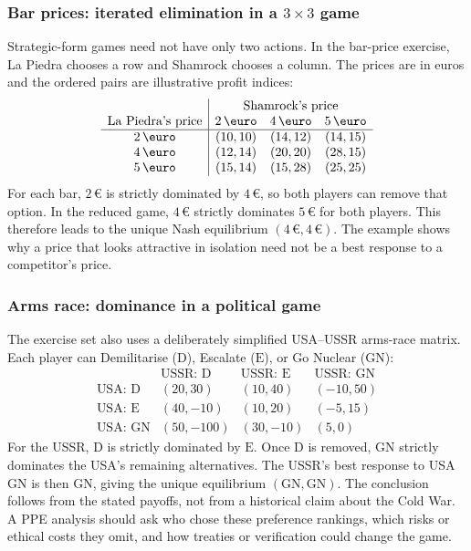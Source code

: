 \subsubsection{Bar prices: iterated elimination in a \(3\times3\) game}

Strategic-form games need not have only two actions. In the bar-price exercise,
La Piedra chooses a row and Shamrock chooses a column. The prices are in euros
and the ordered pairs are illustrative profit indices:
\[
\begin{array}{c|ccc}
 & \multicolumn{3}{c}{\text{Shamrock's price}}\\
\text{La Piedra's price} & 2\,\euro & 4\,\euro & 5\,\euro\\
\hline
2\,\euro & (10,10) & (14,12) & (14,15)\\
4\,\euro & (12,14) & (20,20) & (28,15)\\
5\,\euro & (15,14) & (15,28) & (25,25)
\end{array}
\]
For each bar, \(2\,\euro\) is strictly dominated by \(4\,\euro\), so both
players can remove that option. In the reduced game, \(4\,\euro\) strictly
dominates \(5\,\euro\) for both players. This
 therefore
leads to the unique Nash equilibrium \((4\,\euro,4\,\euro)\). The example
shows why a price that looks attractive in isolation need not be a best
response to a competitor's price.

\subsubsection{Arms race: dominance in a political game}

The exercise set also uses a deliberately simplified USA--USSR arms-race
matrix. Each player can Demilitarise (\(\mathrm{D}\)), Escalate
(\(\mathrm{E}\)), or Go Nuclear (\(\mathrm{GN}\)):
\[
\begin{array}{c|ccc}
 & \text{USSR: \(\mathrm{D}\)} & \text{USSR: \(\mathrm{E}\)}
 & \text{USSR: \(\mathrm{GN}\)}\\
\hline
\text{USA: \(\mathrm{D}\)} & (20,30) & (10,40) & (-10,50)\\
\text{USA: \(\mathrm{E}\)} & (40,-10) & (10,20) & (-5,15)\\
\text{USA: \(\mathrm{GN}\)} & (50,-100) & (30,-10) & (5,0)
\end{array}
\]
For the USSR, \(\mathrm{D}\) is strictly dominated by
\(\mathrm{E}\). Once \(\mathrm{D}\) is removed, \(\mathrm{GN}\) strictly
dominates the USA's remaining alternatives. The USSR's best response to USA
\(\mathrm{GN}\) is then \(\mathrm{GN}\), giving the unique equilibrium
\((\mathrm{GN},\mathrm{GN})\). The conclusion follows from the stated
payoffs, not from a historical claim about the Cold War. A PPE analysis should
ask who chose these preference rankings, which risks or ethical costs they
omit, and how treaties or verification could change the game.

